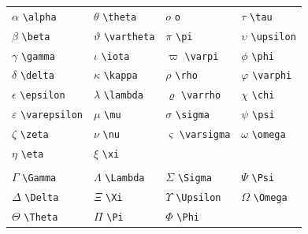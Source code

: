 \documentclass[
  10pt,
]{scrbook}
\theoremstyle{definition}
\theoremstyle{definition}
\theoremstyle{definition}
\theoremstyle{definition}
\theoremstyle{remark}
\begin{document}
\begin{longtable}[]{@{}
  >{\raggedright\arraybackslash}p{}
  >{\raggedright\arraybackslash}p{}
  >{\raggedright\arraybackslash}p{}
  >{\raggedright\arraybackslash}p{}@{}}
\toprule
\endhead
\(\alpha\) \texttt{\textbackslash{}alpha} & \(\theta\) \texttt{\textbackslash{}theta} & \(o\) \texttt{o} & \(\tau\) \texttt{\textbackslash{}tau} \\
\(\beta\) \texttt{\textbackslash{}beta} & \(\vartheta\) \texttt{\textbackslash{}vartheta} & \(\pi\) \texttt{\textbackslash{}pi} & \(\upsilon\) \texttt{\textbackslash{}upsilon} \\
\(\gamma\) \texttt{\textbackslash{}gamma} & \(\iota\) \texttt{\textbackslash{}iota} & \(\varpi\) \texttt{\textbackslash{}varpi} & \(\phi\) \texttt{\textbackslash{}phi} \\
\(\delta\) \texttt{\textbackslash{}delta} & \(\kappa\) \texttt{\textbackslash{}kappa} & \(\rho\) \texttt{\textbackslash{}rho} & \(\varphi\) \texttt{\textbackslash{}varphi} \\
\(\epsilon\) \texttt{\textbackslash{}epsilon} & \(\lambda\) \texttt{\textbackslash{}lambda} & \(\varrho\) \texttt{\textbackslash{}varrho} & \(\chi\) \texttt{\textbackslash{}chi} \\
\(\varepsilon\) \texttt{\textbackslash{}varepsilon} & \(\mu\) \texttt{\textbackslash{}mu} & \(\sigma\) \texttt{\textbackslash{}sigma} & \(\psi\) \texttt{\textbackslash{}psi} \\
\(\zeta\) \texttt{\textbackslash{}zeta} & \(\nu\) \texttt{\textbackslash{}nu} & \(\varsigma\) \texttt{\textbackslash{}varsigma} & \(\omega\) \texttt{\textbackslash{}omega} \\
\(\eta\) \texttt{\textbackslash{}eta} & \(\xi\) \texttt{\textbackslash{}xi} & & \\
& & & \\
\(\Gamma\) \texttt{\textbackslash{}Gamma} & \(\Lambda\) \texttt{\textbackslash{}Lambda} & \(\Sigma\) \texttt{\textbackslash{}Sigma} & \(\Psi\) \texttt{\textbackslash{}Psi} \\
\(\Delta\) \texttt{\textbackslash{}Delta} & \(\Xi\) \texttt{\textbackslash{}Xi} & \(\Upsilon\) \texttt{\textbackslash{}Upsilon} & \(\Omega\) \texttt{\textbackslash{}Omega} \\
\(\Theta\) \texttt{\textbackslash{}Theta} & \(\Pi\) \texttt{\textbackslash{}Pi} & \(\Phi\) \texttt{\textbackslash{}Phi} & \\
\bottomrule
\end{longtable}
\end{document}
